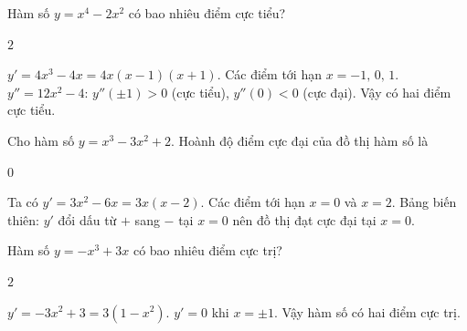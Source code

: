 \documentclass{exam}
\begin{document}
\makeheader


\begin{question}
Hàm số $y = x^4 - 2x^2$ có bao nhiêu điểm cực tiểu?





\end{question}

\begin{dapan}
$2$
\end{dapan}


\begin{loigiai}
$y' = 4x^3 - 4x = 4x(x-1)(x+1)$. Các điểm tới hạn $x = -1,\,0,\,1$. $y'' = 12x^2 - 4$: $y''(\pm 1) > 0$ (cực tiểu), $y''(0) < 0$ (cực đại). Vậy có hai điểm cực tiểu.
\end{loigiai}



\begin{question}
Cho hàm số $y = x^3 - 3x^2 + 2$. Hoành độ điểm cực đại của đồ thị hàm số là





\end{question}

\begin{dapan}
$0$
\end{dapan}


\begin{loigiai}
Ta có $y' = 3x^2 - 6x = 3x(x-2)$. Các điểm tới hạn $x = 0$ và $x = 2$. Bảng biến thiên: $y'$ đổi dấu từ $+$ sang $-$ tại $x = 0$ nên đồ thị đạt cực đại tại $x = 0$.
\end{loigiai}



\begin{question}
Hàm số $y = -x^3 + 3x$ có bao nhiêu điểm cực trị?





\end{question}

\begin{dapan}
$2$
\end{dapan}


\begin{loigiai}
$y' = -3x^2 + 3 = 3(1-x^2)$. $y' = 0$ khi $x = \pm 1$. Vậy hàm số có hai điểm cực trị.
\end{loigiai}
\end{document}

